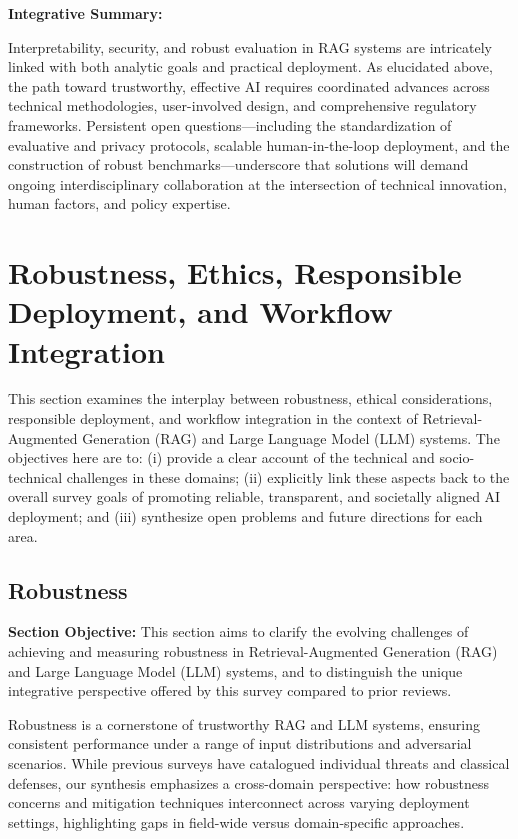 \documentclass[sigconf]{acmart}
\begin{document}
\textbf{Integrative Summary:} 

Interpretability, security, and robust evaluation in RAG systems are intricately linked with both analytic goals and practical deployment. As elucidated above, the path toward trustworthy, effective AI requires coordinated advances across technical methodologies, user-involved design, and comprehensive regulatory frameworks. Persistent open questions---including the standardization of evaluative and privacy protocols, scalable human-in-the-loop deployment, and the construction of robust benchmarks---underscore that solutions will demand ongoing interdisciplinary collaboration at the intersection of technical innovation, human factors, and policy expertise.

\section{Robustness, Ethics, Responsible Deployment, and Workflow Integration}

This section examines the interplay between robustness, ethical considerations, responsible deployment, and workflow integration in the context of Retrieval-Augmented Generation (RAG) and Large Language Model (LLM) systems. The objectives here are to: (i) provide a clear account of the technical and socio-technical challenges in these domains; (ii) explicitly link these aspects back to the overall survey goals of promoting reliable, transparent, and societally aligned AI deployment; and (iii) synthesize open problems and future directions for each area.

\subsection{Robustness}
\textbf{Section Objective:} This section aims to clarify the evolving challenges of achieving and measuring robustness in Retrieval-Augmented Generation (RAG) and Large Language Model (LLM) systems, and to distinguish the unique integrative perspective offered by this survey compared to prior reviews.

Robustness is a cornerstone of trustworthy RAG and LLM systems, ensuring consistent performance under a range of input distributions and adversarial scenarios. While previous surveys have catalogued individual threats and classical defenses, our synthesis emphasizes a cross-domain perspective: how robustness concerns and mitigation techniques interconnect across varying deployment settings, highlighting gaps in field-wide versus domain-specific approaches.
\end{document}
